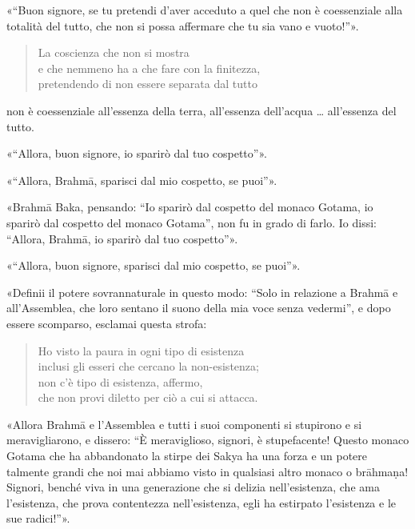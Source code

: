 «“Buon signore, se tu pretendi d’aver acceduto a quel che non è coessenziale
alla totalità del tutto, che non si possa affermare che tu sia vano e vuoto!”».

\begin{quote}

\label{pag162}%
La coscienza che non si mostra \\
e che nemmeno ha a che fare con la finitezza, \\
pretendendo di non essere separata dal tutto

\end{quote}

non è coessenziale all’essenza della terra, all’essenza dell’acqua … all’essenza
del tutto.

«“Allora, buon signore, io sparirò dal tuo cospetto”».

«“Allora, Brahmā, sparisci dal mio cospetto, se puoi”».

«Brahmā Baka, pensando: “Io sparirò dal cospetto del monaco Gotama, io sparirò
dal cospetto del monaco Gotama”, non fu in grado di farlo. Io dissi: “Allora,
Brahmā, io sparirò dal tuo cospetto”».

«“Allora, buon signore, sparisci dal mio cospetto, se puoi”».

«Definii il potere sovrannaturale in questo modo: “Solo in relazione a Brahmā e
all’Assemblea, che loro sentano il suono della mia voce senza vedermi”, e dopo
essere scomparso, esclamai questa strofa:

\begin{quote}
Ho visto la paura in ogni tipo di esistenza \\
inclusi gli esseri che cercano la non-esistenza; \\
non c’è tipo di esistenza, affermo, \\
che non provi diletto per ciò a cui si attacca.
\end{quote}

«Allora Brahmā e l’Assemblea e tutti i suoi componenti si stupirono e si
meravigliarono, e dissero: “È meraviglioso, signori, è stupefacente! Questo
monaco Gotama che ha abbandonato la stirpe dei Sakya ha una forza e un potere
talmente grandi che noi mai abbiamo visto in qualsiasi altro monaco o brāhmaṇa!
Signori, benché viva in una generazione che si delizia nell’esistenza, che ama
l’esistenza, che prova contentezza nell’esistenza, egli ha estirpato l’esistenza
e le sue radici!”».

